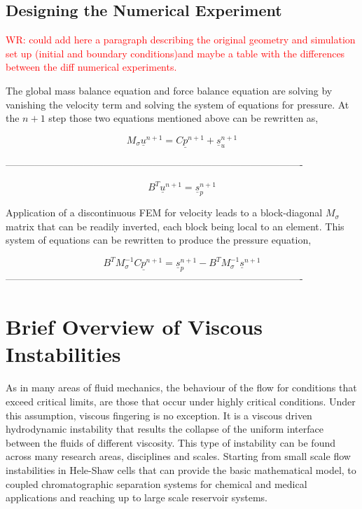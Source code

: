 \documentclass[preprint,authoryear,12pt]{elsarticle}
\begin{document}
\subsection{Designing the Numerical Experiment}\label{section:NumericalExperiment}
\textcolor{red}{WR: could add here a paragraph describing the original geometry and simulation set up (initial and boundary conditions)and maybe a table with the differences between the diff numerical experiments.}

The global mass balance equation and force balance equation are solving by vanishing the velocity term and solving the system of equations for pressure. At the $n+1$ step those two equations mentioned above can be rewritten as, 

\begin{equation}
M_{\sigma} {{\underline{u}}^{n+1}} = C {\underline{p}^{n+1}} + {\underline{s}_u ^{n+1}}
\label{mass balance eq}
\end{equation}

-------------------------------------------------------------------------------------------

\begin{equation}
B^T {{\underline{u}}^{n+1}} = {\underline{s}_p ^{n+1}}
\label{force balance eq}
\end{equation}

\noindent Application of a discontinuous FEM for velocity leads to a block-diagonal $M_{\sigma}$ matrix that can be readily inverted, each block being local to an element. This system of equations can be rewritten to produce the pressure equation, 

\begin{equation}
B^T M_{\sigma} ^{-1} C{{\underline{p}}^{n+1}} = {\underline{s}_p ^{n+1}} - B^T M_{\sigma} ^{-1} {{\underline{s}}^{n+1}} 
\label{pressure eq}
\end{equation}
-------------------------------------------------------------------------------------------
   

\section{Brief Overview of Viscous Instabilities}\label{section:ViscousInstabilities}
As in many areas of fluid mechanics, the behaviour of the flow for conditions that exceed critical limits, are those that occur under highly critical conditions. Under this assumption, viscous fingering is no exception. It is a viscous driven hydrodynamic instability that results the collapse of the uniform interface between the fluids of different viscosity. This type of instability can be found across many research areas, disciplines and scales. Starting from small scale flow instabilities in Hele-Shaw cells that can provide the basic mathematical model, to coupled chromatographic separation systems for chemical and medical applications and reaching up to large scale reservoir systems.
\end{document}
